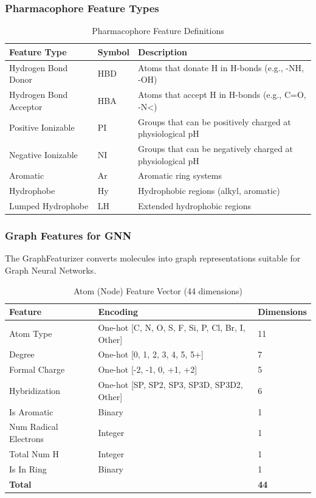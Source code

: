 \documentclass[11pt,a4paper]{article}
\begin{document}
\subsubsection{Pharmacophore Feature Types}

\begin{table}[H]
\centering
\caption{Pharmacophore Feature Definitions}
\begin{tabular}{@{}llp{6cm}@{}}
\toprule
\textbf{Feature Type} & \textbf{Symbol} & \textbf{Description} \\
\midrule
Hydrogen Bond Donor & HBD & Atoms that donate H in H-bonds (e.g., -NH, -OH) \\
Hydrogen Bond Acceptor & HBA & Atoms that accept H in H-bonds (e.g., C=O, -N<) \\
Positive Ionizable & PI & Groups that can be positively charged at physiological pH \\
Negative Ionizable & NI & Groups that can be negatively charged at physiological pH \\
Aromatic & Ar & Aromatic ring systems \\
Hydrophobe & Hy & Hydrophobic regions (alkyl, aromatic) \\
Lumped Hydrophobe & LH & Extended hydrophobic regions \\
\bottomrule
\end{tabular}
\end{table}

\subsubsection{Graph Features for GNN}

The GraphFeaturizer converts molecules into graph representations suitable for Graph Neural Networks.

\begin{table}[H]
\centering
\caption{Atom (Node) Feature Vector (44 dimensions)}
\begin{tabular}{@{}lll@{}}
\toprule
\textbf{Feature} & \textbf{Encoding} & \textbf{Dimensions} \\
\midrule
Atom Type & One-hot [C, N, O, S, F, Si, P, Cl, Br, I, Other] & 11 \\
Degree & One-hot [0, 1, 2, 3, 4, 5, 5+] & 7 \\
Formal Charge & One-hot [-2, -1, 0, +1, +2] & 5 \\
Hybridization & One-hot [SP, SP2, SP3, SP3D, SP3D2, Other] & 6 \\
Is Aromatic & Binary & 1 \\
Num Radical Electrons & Integer & 1 \\
Total Num H & Integer & 1 \\
Is In Ring & Binary & 1 \\
\midrule
\textbf{Total} & & \textbf{44} \\
\bottomrule
\end{tabular}
\end{table}
\end{document}
